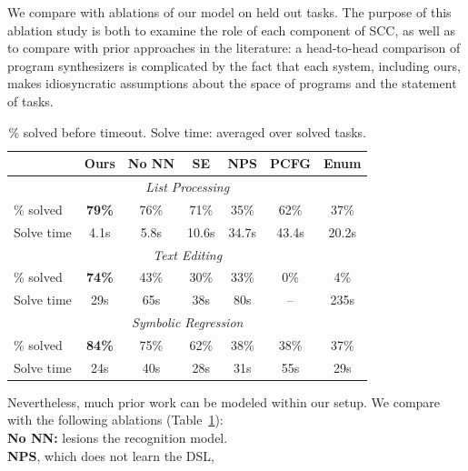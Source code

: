 \documentclass{article}
\newcommand{\systemEnding}{\textsc{SCC}}
\newcommand{\expect}{\mathds{E}} %
\newcommand{\probability}{\mathds{P}} %
\begin{document}
We compare with ablations of our model on held out tasks.
The purpose of this ablation study is 
both to examine the role of each component of \systemEnding,
as well as to compare with
prior approaches in the literature:
a head-to-head
comparison of program synthesizers is complicated by the fact that
each system, including ours, makes idiosyncratic 
assumptions about the space of programs and the statement of tasks.
\begin{table}
\vspace{-5pt}
\tabcolsep=2.5pt
\renewcommand{\arraystretch}{0.5}
\begin{tabular}{lcccccc}
  \toprule& Ours& 
    No NN & SE&NPS & PCFG & Enum \\
  \midrule
  \multicolumn{7}{c}{\emph{List Processing}}\\
  \midrule
  \% solved&\textbf{79\%}\footnotemark & 
  76\% &71\%&35\%&62\%&37\%\\
  Solve time&  4.1s&5.8s&10.6s&34.7s&43.4s&20.2s\\
  \midrule
  \multicolumn{7}{c}{\emph{Text Editing}}\\
  \midrule
  \% solved&\textbf{74\%} &43\% &30\%&33\%&0\%&4\%\\
  Solve time& 29s&65s&38s&80s&--&235s\\
  \midrule
  \multicolumn{7}{c}{\emph{Symbolic Regression}}\\
  \midrule
  \% solved&   \textbf{84\% }&75\%&62\%&38\%&38\%&37\% \\
  Solve time&  24s& 40s  &28s&31s&55s&29s\\
  \bottomrule
  \end{tabular}
\caption{\% solved before timeout. Solve time: averaged over solved
  tasks.  %
}\vspace{-0.5cm}\label{baselineComparisons} \end{table}
Nevertheless, much prior work can be modeled within our setup. 
We compare with the following ablations (Table~\ref{baselineComparisons}):
\\\noindent \textbf{No NN:} lesions the recognition model.
\\\noindent \textbf{NPS}, which does not learn the DSL,
\end{document}
